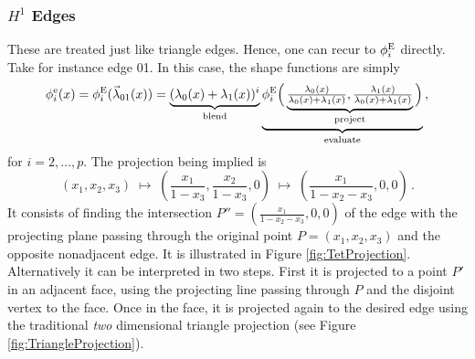
\subsubsection{\texorpdfstring{$H^1$}{H1}  Edges}

These are treated just like triangle edges. 
Hence, one can recur to $\phi_i^{\mathrm{E}}$ directly. 
Take for instance edge 01. In this case, the shape functions are simply
\begin{equation*}
      \phi_i^\mathrm{e}(x)=\phi_i^{\mathrm{E}}(\vec{\lambda}_{01}(x))
    	=\underbrace{(\lambda_0(x)+\lambda_1(x))^i}_{\text{blend}}
    		\underbrace{\phi_i^{\mathrm{E}}\Big(\underbrace{\textstyle{\frac{\lambda_0(x)}{\lambda_0(x)+\lambda_1(x)}},
    			\textstyle{\frac{\lambda_1(x)}{\lambda_0(x)+\lambda_1(x)}}}_{\text{project}}\Big)}_{\text{evaluate}}\,,
\end{equation*}
for $i=2,\ldots,p$. 
The projection being implied is
\begin{equation*}
	(x_1,x_2,x_3)\;\longmapsto\;(\textstyle{\frac{x_1}{1-x_3}},\textstyle{\frac{x_2}{1-x_3}},0)
		\;\longmapsto\;(\textstyle{\frac{x_1}{1-x_2-x_3}},0,0)\,.
\end{equation*}
It consists of finding the intersection $P''=(\frac{x_1}{1-x_2-x_3},0,0)$ of the edge with the projecting plane passing through the original point $P=(x_1,x_2,x_3)$ and the opposite nonadjacent edge.
It is illustrated in Figure \ref{fig:TetProjection}. 
Alternatively it can be interpreted in two steps.
First it is projected to a point $P'$ in an adjacent face, using the projecting line passing through $P$ and the disjoint vertex to the face.
Once in the face, it is projected again to the desired edge using the traditional \textit{two} dimensional triangle projection (see Figure \ref{fig:TriangleProjection}).


